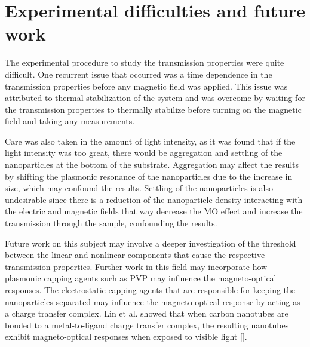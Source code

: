 \section{Experimental difficulties and future work}
The experimental procedure to study the transmission properties were quite difficult. One recurrent issue that occurred was a time dependence in the transmission properties before any magnetic field was applied. This issue was attributed to thermal stabilization of the system and was overcome by waiting for the transmission properties to thermally stabilize before turning on the magnetic field and taking any measurements.

Care was also taken in the amount of light intensity, as it was found that if the light intensity was too great, there would be aggregation and settling of the nanoparticles at the bottom of the substrate. Aggregation may affect the results by shifting the plasmonic resonance of the nanoparticles due to the increase in size, which may confound the results. Settling of the nanoparticles is also undesirable since there is a reduction of the nanoparticle density interacting with the electric and magnetic fields that way decrease the MO effect and increase the transmission through the sample, confounding the results.

Future work on this subject may involve a deeper investigation of the threshold between the linear and nonlinear components that cause the respective transmission properties. Further work in this field may incorporate how plasmonic capping agents such as PVP may influence the magneto-optical responses. The electrostatic capping agents that are responsible for keeping the nanoparticles separated may influence the magneto-optical response by acting as a charge transfer complex. Lin et al. showed that when carbon nanotubes are bonded to a metal-to-ligand charge transfer complex, the resulting nanotubes exhibit magneto-optical responses when exposed to visible light [\cite{Lin:2015}]. 